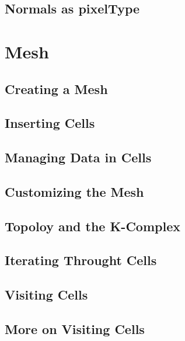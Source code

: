 



\subsection{Normals as pixelType}
\label{sec:PointSetWithCovariantVectorsAsPixelType}






\section{Mesh}\label{MeshSection}

\subsection{Creating a Mesh}
\label{sec:CreatingAMesh}




\subsection{Inserting Cells}
\label{sec:InsertingCellsInMesh}




\subsection{Managing Data in Cells}
\label{sec:ManagingCellDataInMesh}




\subsection{Customizing the Mesh}
\label{sec:CustomizingTheMesh}




\subsection{Topoloy and the K-Complex}
\label{sec:MeshKComplex}




\subsection{Iterating Throught Cells}
\label{sec:MeshCellsIteration}




\subsection{Visiting Cells}
\label{sec:MeshCellVisitor}




\subsection{More on Visiting Cells}
\label{sec:MeshCellVisitorMultipleType}




